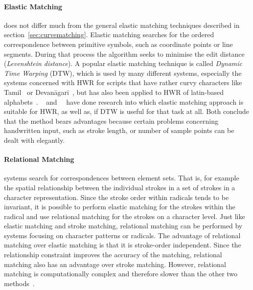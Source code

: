 \paragraph{Elastic Matching} does not differ much from the general elastic matching 
techniques described in section~\ref{sec:curvematching}. Elastic matching 
searches for the ordered correspondence between primitive symbols, such as 
coordinate points or line segments. During that process the algorithm seeks to
minimise the edit distance (\emph{Levenshtein distance}). A popular elastic 
matching technique is called \emph{Dynamic Time Warping} (DTW), which is used by
many different systems, especially the systems concerned with HWR for scripts 
that have rather curvy characters like Tamil~ or 
Devanāgarī~, but has also been applied to HWR of
latin-based alphabets~.
~\citeyear{Niels2004} and~~\citeyear{Joshi2004a} have done research into which 
elastic matching approach is suitable for HWR, as well as, if DTW is useful for 
that task at all. Both conclude that the method bears advantages because 
certain problems concerning handwritten input, such as stroke length, or number 
of sample points can be dealt with elegantly.

\paragraph{Relational Matching} systems search for correspondences between 
element sets. That is, for example the spatial relationship between the 
individual strokes in a set of strokes in a character representation. 
Since the stroke order within radicals tends to be invariant, 
it is possible to perform elastic matching for the strokes
within the radical and use relational matching for the strokes on a character 
level. Just like elastic matching and stroke matching, relational matching can
be performed by systems focusing on character patterns or radicals.
The advantage of relational matching over elastic matching is that it is 
stroke-order independent. Since the relationship constraint improves the accuracy
of the matching, relational matching also has an advantage over stroke matching.
However, relational matching is computationally complex and therefore slower 
than the other two methods~.

